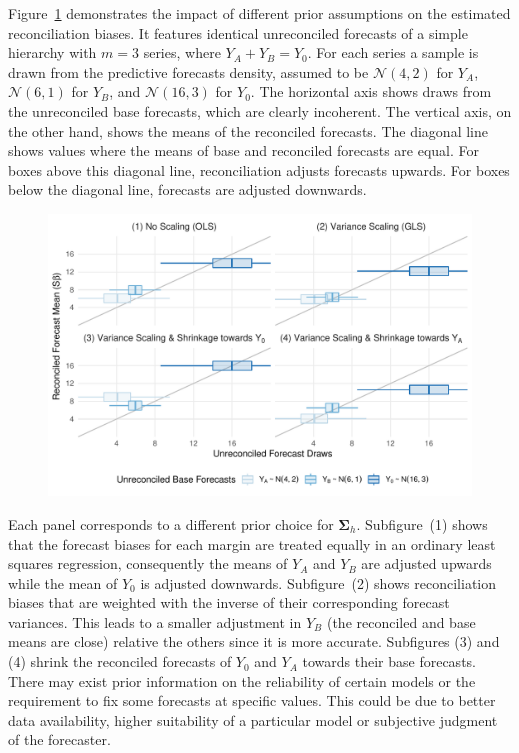 \documentclass[a4paper,fleqn,11pt]{article}
\begin{document}
Figure~\ref{fig:weights} demonstrates the impact of different prior assumptions on the estimated reconciliation biases. It features identical unreconciled forecasts of a simple hierarchy with $m=3$ series, where $Y_A + Y_B = Y_0$. For each series a sample is drawn from the predictive forecasts density, assumed to be $\mathcal{N}(4,2)$ for $Y_A$, $\mathcal{N}(6,1)$ for $Y_B$, and $\mathcal{N}(16,3)$ for $Y_0$. The horizontal axis shows draws from the unreconciled base forecasts, which are clearly incoherent. The vertical axis, on the other hand, shows the means of the reconciled forecasts. The diagonal line shows values where the means of base and reconciled forecasts are equal. For boxes above this diagonal line, reconciliation adjusts forecasts upwards. For boxes below the diagonal line, forecasts are adjusted downwards.
\begin{figure}[H]
	\includegraphics[width=\textwidth]{fig/fig_biases}
	\label{fig:weights}
\end{figure}
Each panel corresponds to a different prior choice for $\boldsymbol{\Sigma}_h$. Subfigure~(1) shows that the forecast biases for each margin are treated equally in an ordinary least squares regression, consequently the means of $Y_A$ and $Y_B$ are adjusted upwards while the mean of $Y_0$ is adjusted downwards. Subfigure~(2) shows reconciliation biases that are weighted with the inverse of their corresponding forecast variances. This leads to a smaller adjustment in $Y_B$ (the reconciled and base means are close) relative the others since it is more accurate. Subfigures (3) and (4) shrink the reconciled forecasts of $Y_0$ and $Y_A$ towards their base forecasts. There may exist prior information on the reliability of certain models or the requirement to fix some forecasts at specific values. This could be due to better data availability, higher suitability of a particular model or subjective judgment of the forecaster. 
\end{document}
